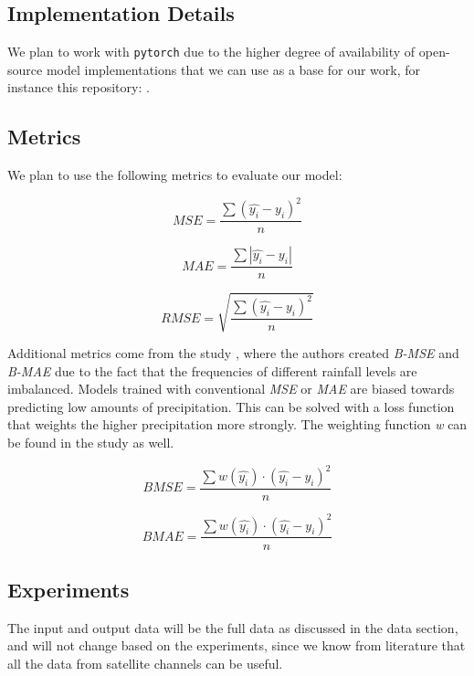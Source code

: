 \documentclass[acmtog, authorversion]{acmart}
\begin{document}
\subsection{Implementation Details}

We plan to work with \texttt{pytorch} due to the higher degree of availability of open-source model implementations that we can use as a base for our work, for instance this repository: \cite{openclimatefix-no-date}.

\subsection{Metrics}
We plan to use the following metrics to evaluate our model:

\begin{equation}
MSE = \frac{\sum (\hat{y_i} -y_i)^2}{n}
\end{equation}

\begin{equation}
MAE = \frac{\sum |\hat{y_i} -y_i|}{n}
\end{equation}

\begin{equation}
RMSE = \sqrt{\frac{\sum (\hat{y_i} -y_i)^2}{n}}
\end{equation}

Additional metrics come from the study \cite{shi2017deep}, where the authors created \textit{B-MSE} and \textit{B-MAE} due to the fact that the frequencies of different rainfall levels are imbalanced. Models trained with conventional \textit{MSE} or \textit{MAE} are biased towards predicting low amounts of precipitation. This can be solved with a loss function that weights the higher precipitation more strongly. The weighting function \textit{w} can be found in the study as well.

\begin{equation}
BMSE = \frac{\sum w(\hat{y_i}) \cdot (\hat{y_i} -y_i)^2}{n}
\end{equation}

\begin{equation}
BMAE = \frac{\sum w(\hat{y_i})  \cdot (\hat{y_i} -y_i)^2}{n}
\end{equation}

\subsection{Experiments}

The input and output data will be the full data as discussed in the data section, and will not change based on the experiments, since we know from literature that all the data from satellite channels can be useful.
\end{document}
